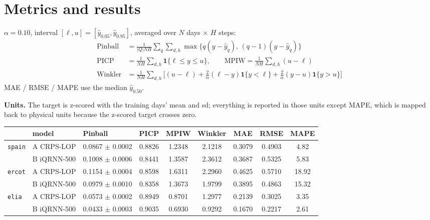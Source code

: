 \documentclass[11pt,a4paper]{article}
\newcommand{\yhat}{\hat{y}}
\newcommand{\ind}{\mathbf{1}}
\begin{document}
\section{Metrics and results}

\noindent
$\alpha = 0.10$, interval $[\ell, u] = [\yhat_{0.05}, \yhat_{0.95}]$, averaged over
$N$ days $\times$ $H$ steps:
\begin{align}
  \mathrm{Pinball} &= \tfrac{1}{|Q| N H} \sum_{q}\sum_{d,h}
      \max\{q(y-\yhat_q),\,(q-1)(y-\yhat_q)\} \\
  \mathrm{PICP} &= \tfrac{1}{NH}\sum_{d,h} \ind\{\ell \leq y \leq u\},
  \qquad
  \mathrm{MPIW} = \tfrac{1}{NH}\sum_{d,h} (u - \ell) \\
  \mathrm{Winkler} &= \tfrac{1}{NH}\sum_{d,h}\Big[(u-\ell)
      + \tfrac{2}{\alpha}(\ell-y)\ind\{y<\ell\}
      + \tfrac{2}{\alpha}(y-u)\ind\{y>u\}\Big]
\end{align}
MAE / RMSE / MAPE use the median $\yhat_{0.50}$.

\medskip
\noindent
\textbf{Units.} The target is z-scored with the training days' mean and sd; everything is
reported in those units except MAPE, which is mapped back to physical units because the
z-scored target crosses zero.

\begin{center}
\small
\begin{tabular}{@{}l l l c c c c c c@{}}
\toprule
 & model & Pinball & PICP & MPIW & Winkler & MAE & RMSE & MAPE \\
\midrule
\texttt{spain} & A CRPS-LOP & 0.0867 $\pm$ 0.0002 & 0.8826 & 1.2348 & 2.1218 & 0.3079 & 0.4903 & 4.82 \\
               & B iQRNN-500 & 0.1008 $\pm$ 0.0006 & 0.8441 & 1.3587 & 2.3612 & 0.3687 & 0.5325 & 5.83 \\
\addlinespace
\texttt{ercot} & A CRPS-LOP & 0.1154 $\pm$ 0.0004 & 0.8598 & 1.6311 & 2.2960 & 0.4625 & 0.5710 & 18.92 \\
               & B iQRNN-500 & 0.0979 $\pm$ 0.0010 & 0.8358 & 1.3673 & 1.9799 & 0.3895 & 0.4863 & 15.32 \\
\addlinespace
\texttt{elia}  & A CRPS-LOP & 0.0573 $\pm$ 0.0002 & 0.8949 & 0.8701 & 1.2977 & 0.2139 & 0.3025 & 3.35 \\
               & B iQRNN-500 & 0.0433 $\pm$ 0.0003 & 0.9035 & 0.6930 & 0.9292 & 0.1670 & 0.2217 & 2.61 \\
\bottomrule
\end{tabular}
\end{center}
\end{document}
